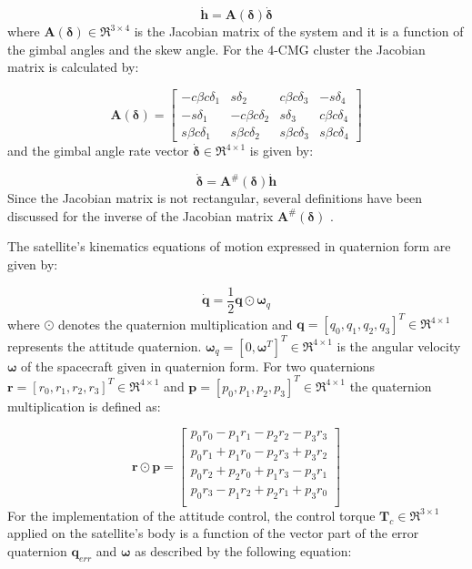 \documentclass[aerospace,article,submit,moreauthors,dvi2pdf]{Definitions/mdpi}
\begin{document}
\begin{equation}
   \dot{ \textbf{h}}=\textbf{A}(\boldsymbol{\delta})\dot{\boldsymbol{\delta}}
\end{equation}
where $\textbf{A}(\boldsymbol{\delta})\in\Re^{3\times4} $ is the Jacobian matrix of the system and it is a function of the gimbal angles and the skew angle. For the 4-CMG cluster the Jacobian matrix is calculated by:

\begin{equation}
\textbf{A}(\boldsymbol{\delta})=
\begin{bmatrix}
-c\beta c\delta_{1} & s\delta_{2} & c\beta c\delta_{3} & -s\delta_{4}\\
-s\delta_{1} & -c\beta c\delta_{2} & s\delta_{3} & c\beta c\delta_{4}\\
s\beta c\delta_{1} & s\beta c\delta_{2} & s\beta c\delta_{3} & s\beta c\delta_{4}
\end{bmatrix}
\end{equation}
and the gimbal angle rate vector $\boldsymbol{\dot{\delta}}\in\Re^{4\times1}$ is given by:

\begin{equation}
\label{eq:inverse}
   \dot{\boldsymbol{\delta}}=\textbf{A}^\#(\boldsymbol{\delta}) \dot{ \textbf{h}}
\end{equation}
Since the Jacobian matrix is not rectangular, several definitions have been discussed for the inverse of the Jacobian matrix $\textbf{A}^\#(\boldsymbol{\delta})$ \cite{bongwie2001}.

The satellite's kinematics equations of motion expressed in quaternion form are given by:

\begin{equation}
\dot{\textbf{q}}=\frac{1}{2}\textbf{q}\odot\boldsymbol{\omega}_q
\label{eq:quaternion_dot}
\end{equation}
where $\odot$ denotes the quaternion multiplication and $\textbf{q}=[q_0, q_1, q_2, q_3]^T\in\Re^{4\times1}$ represents the attitude quaternion. $\boldsymbol{\omega}_q=[0,\boldsymbol{\omega}^T]^T\in\Re^{4\times1}$ is the angular velocity $\boldsymbol{\omega}$ of the spacecraft given in quaternion form. For two quaternions $\textbf{r}=[r_0,r_1,r_2,r_3]^T\in\Re^{4\times1}$ and $\textbf{p}=[p_0,p_1,p_2,p_3]^T\in\Re^{4\times1}$ the quaternion multiplication is defined as:

\begin{equation}
\textbf{r} \odot \textbf{p} =
\begin{bmatrix}
p_0r_0 - p_1r_1 - p_2r_2 - p_3r_3\\
 p_0r_1 + p_1r_0 - p_2r_3 + p_3r_2\\
 p_0r_2 + p_2r_0 + p_1r_3 - p_3r_1\\
 p_0r_3 - p_1r_2 + p_2r_1 + p_3r_0\\
\end{bmatrix}
\end{equation}
For the implementation of the attitude control, the control torque $\textbf{T}_c \in\Re^{3\times1}$ applied on the satellite's body is a function of the vector part of the error quaternion $\textbf{q}_{err}$ and $\boldsymbol{\omega}$ as described by the following equation:
\end{document}
